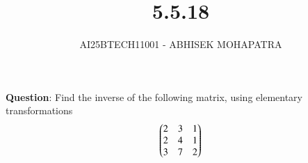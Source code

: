\documentclass[journal,12pt,onecolumn]{IEEEtran}
\begin{document}
\title{5.5.18}
\author{AI25BTECH11001 - ABHISEK MOHAPATRA}
{\let\newpage\relax\maketitle}
	 	\textbf{Question}:
Find the inverse of the following matrix, using elementary transformations
\begin{align*}
		\begin{pmatrix}2&3&1\\2&4&1\\3&7&2\end{pmatrix}
\end{align*}
		
\end{document}
